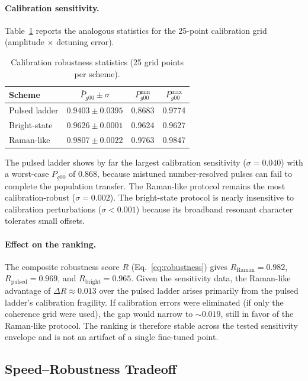 \documentclass[aps,pra,twocolumn,reprint,floatfix,amsmath,amssymb]{revtex4-2}
\begin{document}
\paragraph{Calibration sensitivity.}
Table~\ref{tab:calibration_sensitivity} reports the analogous statistics for the 25-point calibration grid (amplitude $\times$ detuning error).

\begin{table}[t]
\caption{Calibration robustness statistics (25 grid points per scheme).}
\label{tab:calibration_sensitivity}
\begin{tabular}{lccc}
\toprule
Scheme & $\bar{P}_{g00} \pm \sigma$ & $P_{g00}^{\min}$ & $P_{g00}^{\max}$ \\
\midrule
Pulsed ladder   & $0.9403 \pm 0.0395$ & 0.8683 & 0.9774 \\
Bright-state    & $0.9626 \pm 0.0001$ & 0.9624 & 0.9627 \\
Raman-like      & $0.9807 \pm 0.0022$ & 0.9763 & 0.9847 \\
\bottomrule
\end{tabular}
\end{table}

The pulsed ladder shows by far the largest calibration sensitivity ($\sigma = 0.040$) with a worst-case $P_{g00}$ of $0.868$, because mistuned number-resolved pulses can fail to complete the population transfer.
The Raman-like protocol remains the most calibration-robust ($\sigma = 0.002$).
The bright-state protocol is nearly insensitive to calibration perturbations ($\sigma < 0.001$) because its broadband resonant character tolerates small offsets.

\paragraph{Effect on the ranking.}
The composite robustness score $R$ (Eq.~\ref{eq:robustness}) gives $R_{\mathrm{Raman}} = 0.982$, $R_{\mathrm{pulsed}} = 0.969$, and $R_{\mathrm{bright}} = 0.965$.
Given the sensitivity data, the Raman-like advantage of $\Delta R \approx 0.013$ over the pulsed ladder arises primarily from the pulsed ladder's calibration fragility.
If calibration errors were eliminated (if only the coherence grid were used), the gap would narrow to $\sim\!0.019$, still in favor of the Raman-like protocol.
The ranking is therefore stable across the tested sensitivity envelope and is not an artifact of a single fine-tuned point.

\subsection{Speed--Robustness Tradeoff}
\end{document}
